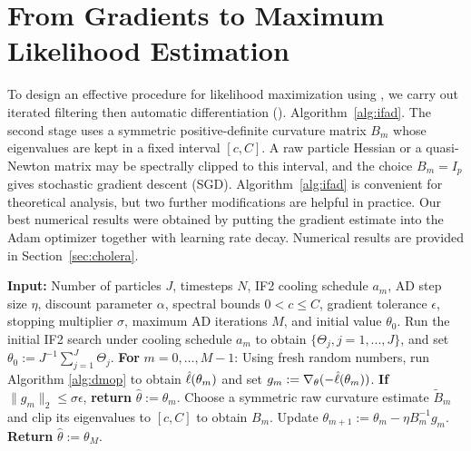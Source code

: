 \section{From Gradients to Maximum Likelihood Estimation}

To design an effective procedure for likelihood maximization using , we carry out iterated filtering then automatic differentiation (). 
 Algorithm~\ref{alg:ifad}.
The second stage uses a symmetric positive-definite curvature matrix $B_m$ whose
eigenvalues are kept in a fixed interval $[c,C]$. A raw particle Hessian or a
quasi-Newton matrix may be spectrally clipped to this interval, and the choice
$B_m=I_p$ gives stochastic gradient descent (SGD).
Algorithm~\ref{alg:ifad} is convenient for theoretical analysis, but two further modifications are helpful in practice.
Our best numerical results were obtained by putting the gradient estimate into the Adam optimizer \citep{kingma15} together with learning rate decay. 
Numerical results are provided in Section~\ref{sec:cholera}.

\begin{algorithm}[htbp!]
	\caption{}
    \label{alg:ifad}
	    \textbf{Input:} Number of particles $J$, timesteps $N$, IF2 cooling schedule $a_m$, AD step size $\eta$, discount parameter $\alpha$, spectral bounds $0<c\leq C$, gradient tolerance $\epsilon$, stopping multiplier $\sigma$, maximum AD iterations $M$, and initial value $\theta_0$.\newline
        Run the initial IF2 search under cooling schedule $a_m$ to obtain $\{\Theta_j, j=1,...,J\}$, and set $\theta_0 := J^{-1}\sum_{j=1}^J \Theta_j.$\newline
		\textbf{For} $m=0,\ldots,M-1$: \newline
		\hspace*{4mm} Using fresh random numbers, run Algorithm \ref{alg:dmop} to obtain $\hat{\ell}(\theta_m)$ and set $g_m := \nabla_{\theta}(-\hat{\ell}(\theta_m))$. \newline
		\hspace*{4mm} \textbf{If} $\|g_m\|_2\leq\sigma\epsilon$, \textbf{return} $\hat\theta:=\theta_m$. \newline
		\hspace*{4mm} Choose a symmetric raw curvature estimate $\widetilde B_m$ and clip its eigenvalues to $[c,C]$ to obtain $B_m$. \newline
		\hspace*{4mm} Update $\theta_{m+1} := \theta_m - \eta B_m^{-1} g_m$. \newline
		\textbf{Return} $\hat{\theta} := \theta_M.$
\end{algorithm}

